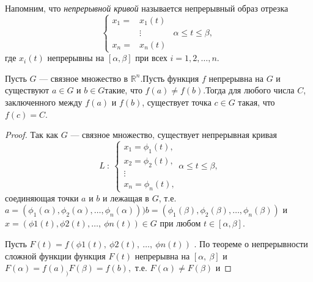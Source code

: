 Напомним, что \emph{непрерывной кривой} называется непрерывный образ отрезка
\[ \left\{
    \begin{aligned}
        x_{1}=&x_{1}(t) & \\
        &\vdots & \alpha\leqslant t\leqslant\beta,\\
        x_{n}=&x_{n}(t) &
    \end{aligned}\right.
\]
где $x_i(t)$ непрерывны на $[\alpha, \beta]$ при всех $i=1,2,\ldots, n$.

\begin{theorem}
    Пусть $G$ --- связное множество в $\mathbb{R}^n$.Пусть функция $f$ непрерывна на $G$ и существуют $a \in G$ и $b \in G$такие, что
    $f(a)\neq f(b)$.Тогда для любого числа $C$, заключенного между $f(a)$ и $f(b)$, существует точка $c \in G$ такая, что $f(c)=C$.
\end{theorem}
\begin{proof}
    Так как $G$ --- связное множество, существует непрерывная кривая
    \[
        L~:~\left\{
            \begin{array}{c}
            x_{1}=\phi_{1}(t),\\
            x_{2}=\phi_{2}(t),\\
            \vdots \\
            x_{n}=\phi_{n}(t),
            \end{array}\right. \alpha\leqslant t\leqslant\beta,
    \]
    соединяющая точки $a$ и $b$ и лежащая в $G$, т.е.
    $a=(\phi_{1}(\alpha), \phi_{2}(\alpha), \ldots, \phi_{n}(\alpha)))b=(\phi_{1}(\beta), \phi_{2}(\beta), \ldots, \phi_{n}(\beta))$ и $x=(\phi 1(t), \phi 2(t), \ldots,\ \phi n(t))\in G$ при любом $t\in[\alpha, \beta].$
    
    Пусть $F(t)=f(\phi 1(t),\ \phi 2(t),\ \ldots,\ \phi n(t))$ . По теореме о непрерывности сложной функции функция $F(t)$ непрерывна на $[\alpha,\ \beta]$ и $F(\alpha)=f(a)_{)}F(\beta)=f(b),$ т.е. $F(\alpha)\neq F(\beta)$ и
    \renewcommand{\qedsymbol}{}
\end{proof}